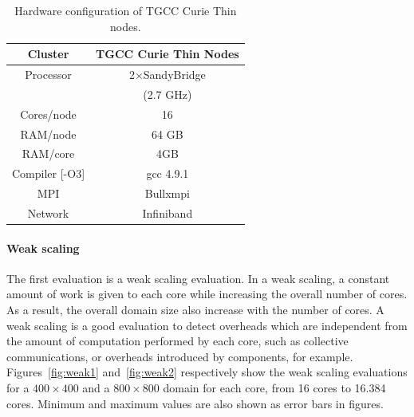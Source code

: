 \begin{table}[!h]
\begin{center}
 \begin{tabular}{|c|c|}
   \hline
    Cluster & \textbf{TGCC Curie Thin Nodes}\\
     \hline         
    Processor & 2$\times$SandyBridge\\
    & (2.7 GHz)\\
    Cores/node & 16 \\
    RAM/node & 64 GB\\
    RAM/core & 4GB\\
    Compiler [-O3] & gcc 4.9.1\\
    MPI & Bullxmpi\\
    Network & Infiniband\\
    \hline
 \end{tabular}
 \caption{\label{tab:TGCC}Hardware configuration of TGCC Curie Thin nodes.}
 \end{center}
\end{table}

\paragraph{\textbf{Weak scaling}} The first evaluation is a weak scaling evaluation. In a weak scaling, a constant amount of work is given to each core while increasing the overall number of cores. As a result, the overall domain size also increase with the number of cores. A weak scaling is a good evaluation to detect overheads which are independent from the amount of computation performed by each core, such as collective communications, or overheads introduced by \llc components, for example. Figures~\ref{fig:weak1} and~\ref{fig:weak2} respectively show the weak scaling evaluations for a $400 \times 400$ and a $800 \times 800$ domain for each core, from 16 cores to 16.384 cores. Minimum and maximum values are also shown as error bars in figures.

